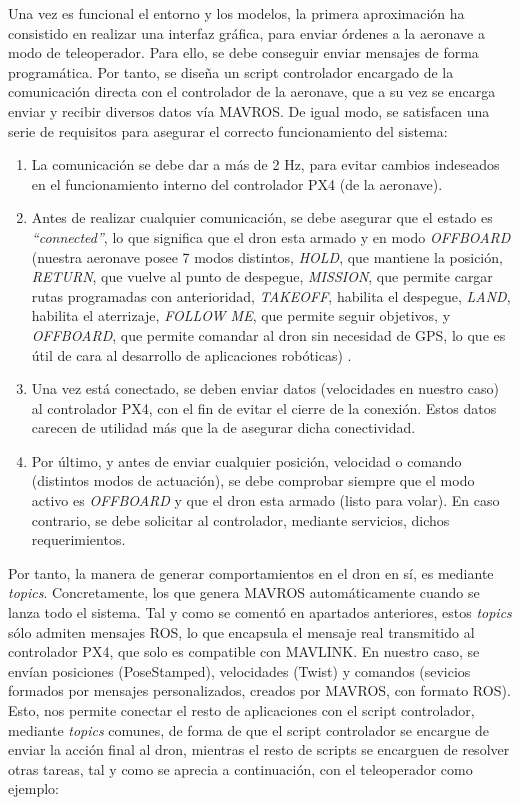 Una vez es funcional el entorno y los modelos, la primera aproximación ha consistido en realizar una interfaz gráfica, para enviar órdenes a la aeronave a modo de teleoperador. Para ello, se debe conseguir enviar mensajes de forma programática. Por tanto, se diseña un script controlador encargado de la comunicación directa con el controlador de la aeronave, que a su vez se encarga enviar y recibir diversos datos vía MAVROS. De igual modo, se satisfacen una serie de requisitos para asegurar el correcto funcionamiento del sistema:

\begin{enumerate}
	\item La comunicación se debe dar a más de 2 Hz, para evitar cambios indeseados en el funcionamiento interno del controlador PX4 (de la aeronave).

	\item Antes de realizar cualquier comunicación, se debe asegurar que el estado es \emph{``connected''}, lo que significa que el dron esta armado y en modo \emph{OFFBOARD} (nuestra aeronave posee 7 modos distintos, \emph{HOLD}, que mantiene la posición, \emph{RETURN}, que vuelve al punto de despegue, \emph{MISSION}, que permite cargar rutas programadas con anterioridad, \emph{TAKEOFF}, habilita el despegue, \emph{LAND}, habilita el aterrizaje, \emph{FOLLOW ME}, que permite seguir objetivos, y \emph{OFFBOARD}, que permite comandar al dron sin necesidad de GPS, lo que es útil de cara al desarrollo de aplicaciones robóticas) \cite{flight-modes}.

    \item Una vez está conectado, se deben enviar datos (velocidades en nuestro caso) al controlador PX4, con el fin de evitar el cierre de la conexión. Estos datos carecen de utilidad más que la de asegurar dicha conectividad.

    \item Por último, y antes de enviar cualquier posición, velocidad o comando (distintos modos de actuación), se debe comprobar siempre que el modo activo es \emph{OFFBOARD} y que el dron esta armado (listo para volar). En caso contrario, se debe solicitar al controlador, mediante servicios, dichos requerimientos.
\end{enumerate}

Por tanto, la manera de generar comportamientos en el dron en sí, es mediante \emph{topics}. Concretamente, los que genera MAVROS automáticamente cuando se lanza todo el sistema. Tal y como se comentó en apartados anteriores, estos \emph{topics} sólo admiten mensajes \ac{ROS}, lo que encapsula el mensaje real transmitido al controlador PX4, que solo es compatible con MAVLINK. En nuestro caso, se envían posiciones (PoseStamped), velocidades (Twist) y comandos (sevicios formados por mensajes personalizados, creados por MAVROS, con formato \ac{ROS}). Esto, nos permite conectar el resto de aplicaciones con el script controlador, mediante \emph{topics} comunes, de forma de que el script controlador se encargue de enviar la acción final al dron, mientras el resto de scripts se encarguen de resolver otras tareas, tal y como se aprecia a continuación, con el teleoperador como ejemplo:\\

